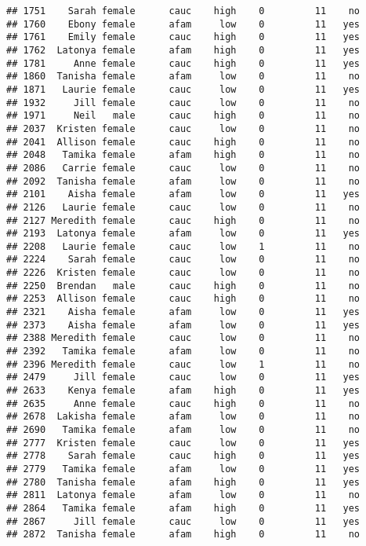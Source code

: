 \documentclass[
]{article}
\begin{document}
\begin{verbatim}
## 1751    Sarah female      cauc    high    0         11    no
## 1760    Ebony female      afam     low    0         11   yes
## 1761    Emily female      cauc    high    0         11   yes
## 1762  Latonya female      afam    high    0         11   yes
## 1781     Anne female      cauc    high    0         11   yes
## 1860  Tanisha female      afam     low    0         11    no
## 1871   Laurie female      cauc     low    0         11   yes
## 1932     Jill female      cauc     low    0         11    no
## 1971     Neil   male      cauc    high    0         11    no
## 2037  Kristen female      cauc     low    0         11    no
## 2041  Allison female      cauc    high    0         11    no
## 2048   Tamika female      afam    high    0         11    no
## 2086   Carrie female      cauc     low    0         11    no
## 2092  Tanisha female      afam     low    0         11    no
## 2101    Aisha female      afam     low    0         11   yes
## 2126   Laurie female      cauc     low    0         11    no
## 2127 Meredith female      cauc    high    0         11    no
## 2193  Latonya female      afam     low    0         11   yes
## 2208   Laurie female      cauc     low    1         11    no
## 2224    Sarah female      cauc     low    0         11    no
## 2226  Kristen female      cauc     low    0         11    no
## 2250  Brendan   male      cauc    high    0         11    no
## 2253  Allison female      cauc    high    0         11    no
## 2321    Aisha female      afam     low    0         11   yes
## 2373    Aisha female      afam     low    0         11   yes
## 2388 Meredith female      cauc     low    0         11    no
## 2392   Tamika female      afam     low    0         11    no
## 2396 Meredith female      cauc     low    1         11    no
## 2479     Jill female      cauc     low    0         11   yes
## 2633    Kenya female      afam    high    0         11   yes
## 2635     Anne female      cauc    high    0         11    no
## 2678  Lakisha female      afam     low    0         11    no
## 2690   Tamika female      afam     low    0         11    no
## 2777  Kristen female      cauc     low    0         11   yes
## 2778    Sarah female      cauc    high    0         11   yes
## 2779   Tamika female      afam     low    0         11   yes
## 2780  Tanisha female      afam    high    0         11   yes
## 2811  Latonya female      afam     low    0         11    no
## 2864   Tamika female      afam    high    0         11   yes
## 2867     Jill female      cauc     low    0         11   yes
## 2872  Tanisha female      afam    high    0         11    no

\end{verbatim}
\end{document}
